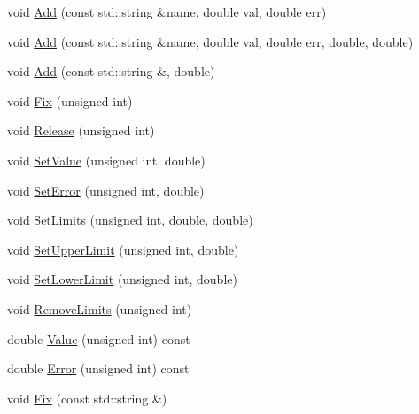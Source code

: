 \begin{DoxyCompactItemize}
\item 
void \mbox{\hyperlink{classROOT_1_1Minuit2_1_1MnUserParameterState_a958abf8c6542ba9be16e298ad2b63001}{Add}} (const std\+::string \&name, double val, double err)
\item 
void \mbox{\hyperlink{classROOT_1_1Minuit2_1_1MnUserParameterState_a3cdf26ae6585812a59b84dd72d7aac51}{Add}} (const std\+::string \&name, double val, double err, double, double)
\item 
void \mbox{\hyperlink{classROOT_1_1Minuit2_1_1MnUserParameterState_a553bf18d39208bf83a8d7898176b20e6}{Add}} (const std\+::string \&, double)
\item 
void \mbox{\hyperlink{classROOT_1_1Minuit2_1_1MnUserParameterState_a89b898660495dd7fb95bb1c398941e17}{Fix}} (unsigned int)
\item 
void \mbox{\hyperlink{classROOT_1_1Minuit2_1_1MnUserParameterState_a7dd23afe69aaab961b536e2cdc75d66e}{Release}} (unsigned int)
\item 
void \mbox{\hyperlink{classROOT_1_1Minuit2_1_1MnUserParameterState_a90490f6f1ab718c8dae1c895d36baf65}{Set\+Value}} (unsigned int, double)
\item 
void \mbox{\hyperlink{classROOT_1_1Minuit2_1_1MnUserParameterState_adf2a80e9887b97dcc01b65184281aaa5}{Set\+Error}} (unsigned int, double)
\item 
void \mbox{\hyperlink{classROOT_1_1Minuit2_1_1MnUserParameterState_a0552162fb1f4fd9ae1be3ea7839fea5b}{Set\+Limits}} (unsigned int, double, double)
\item 
void \mbox{\hyperlink{classROOT_1_1Minuit2_1_1MnUserParameterState_ab79ab45c03ce6dcf71dfc90d967955cf}{Set\+Upper\+Limit}} (unsigned int, double)
\item 
void \mbox{\hyperlink{classROOT_1_1Minuit2_1_1MnUserParameterState_ae2601510da37a8571b0b22fe0e960b51}{Set\+Lower\+Limit}} (unsigned int, double)
\item 
void \mbox{\hyperlink{classROOT_1_1Minuit2_1_1MnUserParameterState_a1ae57d606384e08b0e710c4908543524}{Remove\+Limits}} (unsigned int)
\item 
double \mbox{\hyperlink{classROOT_1_1Minuit2_1_1MnUserParameterState_a0f977953363899fd9ee8933b879cde3e}{Value}} (unsigned int) const
\item 
double \mbox{\hyperlink{classROOT_1_1Minuit2_1_1MnUserParameterState_a16a0c68e252a3fbc3ceb0f41934e376e}{Error}} (unsigned int) const
\item 
void \mbox{\hyperlink{classROOT_1_1Minuit2_1_1MnUserParameterState_a9d24e3eed7080907f4368e87e8770dcd}{Fix}} (const std\+::string \&)

\end{DoxyCompactItemize}
